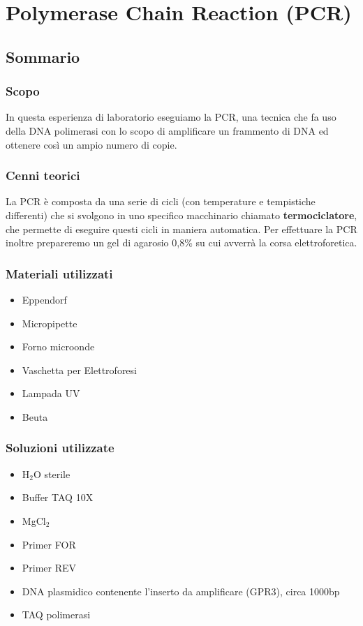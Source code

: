 \chapter{Polymerase Chain Reaction (PCR)}

\vspace{0.6cm}


\section{Sommario}

\subsection{Scopo}

In questa esperienza di laboratorio eseguiamo la PCR, una tecnica che fa uso della
DNA polimerasi con lo scopo di amplificare un frammento di DNA ed ottenere così un
ampio numero di copie.\\

\subsection{Cenni teorici}

La PCR è composta da una serie di cicli (con temperature e tempistiche differenti)
che si svolgono in uno specifico macchinario chiamato \textbf{termociclatore},
che permette di eseguire questi cicli in maniera automatica.
Per effettuare la PCR inoltre prepareremo un gel di agarosio 0,8\%
su cui avverrà la corsa elettroforetica.

\subsection{Materiali utilizzati}

\begin{itemize}
	\item Eppendorf
	\item Micropipette
	\item Forno microonde
	\item Vaschetta per Elettroforesi
	\item Lampada UV
	\item Beuta
\end{itemize}

\subsection{Soluzioni utilizzate}
\begin{itemize}
	\item H$_2$O sterile
	\item Buffer TAQ 10X
	\item MgCl$_2$
	\item Primer FOR
	\item Primer REV
	\item DNA plasmidico contenente l'inserto da amplificare (GPR3), circa 1000bp
	\item TAQ polimerasi
\end{itemize}


